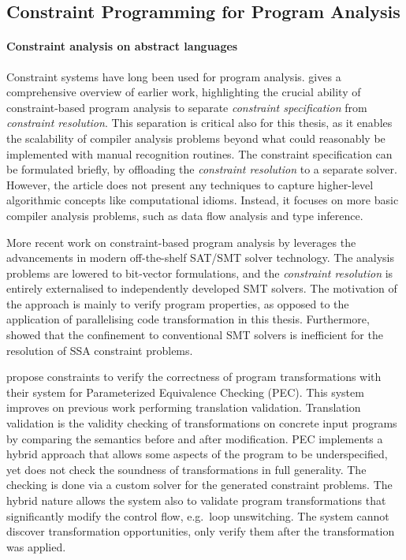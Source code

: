 \subsection{Constraint Programming for Program Analysis}

    \paragraph*{Constraint analysis on abstract languages}
    Constraint systems have long been used for program analysis.
    \citet{Aiken:1999:ISC:339853.339897} gives a comprehensive overview of
    earlier work, highlighting the crucial ability of constraint-based program
    analysis to separate {\it constraint specification} from
    {\it constraint resolution}.
    This separation is critical also for this thesis, as it enables the
    scalability of compiler analysis problems beyond what could reasonably be
    implemented with manual recognition routines.
    The constraint specification can be formulated briefly, by offloading the
    {\it constraint resolution} to a separate solver.
    However, the article does not present any techniques to capture higher-level
    algorithmic concepts like computational idioms.
    Instead, it focuses on more basic compiler analysis problems, such as
    data flow analysis and type inference.

    More recent work on constraint-based program analysis by
    \citet{Gulwani:2008:PAC:1375581.1375616} leverages the advancements in
    modern off-the-shelf SAT/SMT solver technology.
    The analysis problems are lowered to bit-vector formulations, and the
    {\it constraint resolution} is entirely externalised to independently
    developed SMT solvers.
    The motivation of the approach is mainly to verify program properties,
    as opposed to the application of parallelising code transformation in this
    thesis.
    Furthermore,  showed that the confinement to
    conventional SMT solvers is inefficient for the resolution of
    SSA constraint problems.

    \citet{Kundu:2009:POC:1543135.1542513} propose constraints to verify the
    correctness of program transformations with their system for
    Parameterized Equivalence Checking (PEC).
    This system improves on previous work performing translation validation.
    Translation validation is the validity checking of transformations on
    concrete input programs by comparing the semantics before and after
    modification.
    PEC implements a hybrid approach that allows some aspects of the program
    to be underspecified, yet does not check the soundness of transformations
    in full generality.
    The checking is done via a custom solver for the generated constraint
    problems.
    The hybrid nature allows the system also to validate program transformations
    that significantly modify the control flow, e.g.\ loop unswitching.
    The system cannot discover transformation opportunities, only verify them
    after the transformation was applied.


